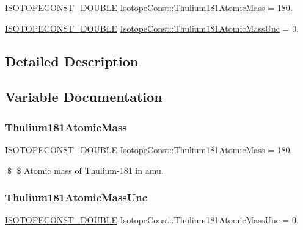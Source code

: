 \begin{DoxyCompactItemize}
\item 
\mbox{\hyperlink{group___isotope_const-_macros_ga8f45a7272ce02c0b4c65c44636ed719a}{I\+S\+O\+T\+O\+P\+E\+C\+O\+N\+S\+T\+\_\+\+D\+O\+U\+B\+LE}} \mbox{\hyperlink{group___isotope_const-_thulium-_tm181_ga590d62497aea130863e7edd29f4f9d94}{Isotope\+Const\+::\+Thulium181\+Atomic\+Mass}} = 180.
\item 
\mbox{\hyperlink{group___isotope_const-_macros_ga8f45a7272ce02c0b4c65c44636ed719a}{I\+S\+O\+T\+O\+P\+E\+C\+O\+N\+S\+T\+\_\+\+D\+O\+U\+B\+LE}} \mbox{\hyperlink{group___isotope_const-_thulium-_tm181_ga6c0285c6072842f1a94b7220d6c96729}{Isotope\+Const\+::\+Thulium181\+Atomic\+Mass\+Unc}} = 0.
\end{DoxyCompactItemize}


\subsection{Detailed Description}


\subsection{Variable Documentation}
\mbox{\label{group___isotope_const-_thulium-_tm181_ga590d62497aea130863e7edd29f4f9d94}} 
\subsubsection{\texorpdfstring{Thulium181\+Atomic\+Mass}{Thulium181AtomicMass}}
{\footnotesize\ttfamily \mbox{\hyperlink{group___isotope_const-_macros_ga8f45a7272ce02c0b4c65c44636ed719a}{I\+S\+O\+T\+O\+P\+E\+C\+O\+N\+S\+T\+\_\+\+D\+O\+U\+B\+LE}} Isotope\+Const\+::\+Thulium181\+Atomic\+Mass = 180.}

\$ \$ Atomic mass of Thulium-\/181 in amu. \mbox{\label{group___isotope_const-_thulium-_tm181_ga6c0285c6072842f1a94b7220d6c96729}} 
\subsubsection{\texorpdfstring{Thulium181\+Atomic\+Mass\+Unc}{Thulium181AtomicMassUnc}}
{\footnotesize\ttfamily \mbox{\hyperlink{group___isotope_const-_macros_ga8f45a7272ce02c0b4c65c44636ed719a}{I\+S\+O\+T\+O\+P\+E\+C\+O\+N\+S\+T\+\_\+\+D\+O\+U\+B\+LE}} Isotope\+Const\+::\+Thulium181\+Atomic\+Mass\+Unc = 0.}

